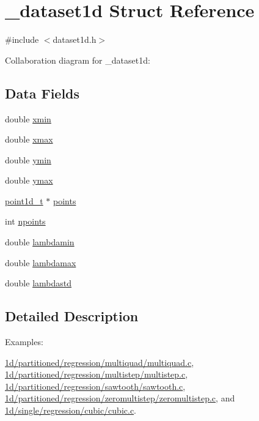 \hypertarget{struct__dataset1d}{}\section{\+\_\+dataset1d Struct Reference}
\label{struct__dataset1d}


{\ttfamily \#include $<$dataset1d.\+h$>$}



Collaboration diagram for \+\_\+dataset1d\+:
\subsection*{Data Fields}
\begin{DoxyCompactItemize}
\item 
double \hyperlink{struct__dataset1d_ae96bdad176cb1e2ff691de6cd46b577b}{xmin}
\item 
double \hyperlink{struct__dataset1d_a006b76fa7e80e3220e6ad66a1ee0b83f}{xmax}
\item 
double \hyperlink{struct__dataset1d_afaee8c7cef9ae50d6c7387f3ac7d4379}{ymin}
\item 
double \hyperlink{struct__dataset1d_aa852aa13aa0a0d4e2b0a8bf83d03fc70}{ymax}
\item 
\hyperlink{dataset1d_8h_a97fb1604d71a5eeb5c0d33355d52def3}{point1d\+\_\+t} $\ast$ \hyperlink{struct__dataset1d_a88bbeb8e6e2273faefb175b91fcfae83}{points}
\item 
int \hyperlink{struct__dataset1d_ab864f8414fd7885ae891e67b615fbb89}{npoints}
\item 
double \hyperlink{struct__dataset1d_ad4d2e3a3d2eb35338ce1d819142cefb8}{lambdamin}
\item 
double \hyperlink{struct__dataset1d_ac07faf1146371645b1cb77495f866f48}{lambdamax}
\item 
double \hyperlink{struct__dataset1d_ab5344ed7583036bc0dc1b9e769273c85}{lambdastd}
\end{DoxyCompactItemize}


\subsection{Detailed Description}
\begin{Desc}
\item[Examples\+: ]\par
\hyperlink{1d_2partitioned_2regression_2multiquad_2multiquad_8c-example}{1d/partitioned/regression/multiquad/multiquad.\+c}, \hyperlink{1d_2partitioned_2regression_2multistep_2multistep_8c-example}{1d/partitioned/regression/multistep/multistep.\+c}, \hyperlink{1d_2partitioned_2regression_2sawtooth_2sawtooth_8c-example}{1d/partitioned/regression/sawtooth/sawtooth.\+c}, \hyperlink{1d_2partitioned_2regression_2zeromultistep_2zeromultistep_8c-example}{1d/partitioned/regression/zeromultistep/zeromultistep.\+c}, and \hyperlink{1d_2single_2regression_2cubic_2cubic_8c-example}{1d/single/regression/cubic/cubic.\+c}.\end{Desc}


